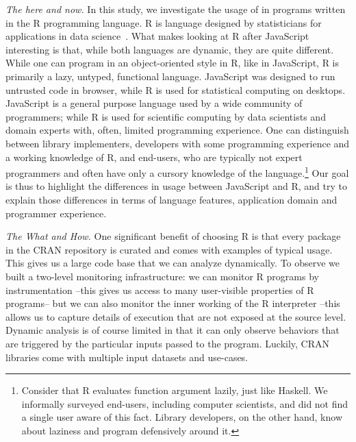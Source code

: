 \documentclass[USenglish,cleveref, autoref, thm-restate]{lipics-v2019}
\begin{document}
\vspace{2mm}\noindent\emph{The here and now.}  In this study, we
investigate the usage of \eval in programs written in the R
programming language. R is language designed by statisticians for
applications in data science~\cite{r,R96}. What makes looking at R after
JavaScript interesting is that, while both languages are dynamic, they
are quite different. While one can program in an object-oriented style
in R, like in JavaScript, R is primarily a lazy, untyped, functional
language.  JavaScript was designed to run untrusted code in browser,
while R is used for statistical computing on desktops. JavaScript is a
general purpose language used by a wide community of programmers;
while R is used for scientific computing by data scientists and domain
experts with, often, limited programming experience. One can
distinguish between library implementers, developers with some
programming experience and a working knowledge of R, and end-users,
who are typically not expert programmers and often have only a cursory
knowledge of the language.\footnote{Consider that R evaluates function
argument lazily, just like Haskell. We informally surveyed end-users,
including computer scientists, and did not find a single user aware of
this fact. Library developers, on the other hand, know about laziness
and program defensively around it.} Our goal is thus to highlight the
differences in usage between JavaScript and R, and try to explain
those differences in terms of language features, application domain
and programmer experience.

\vspace{2mm}\noindent\emph{The What and How.}  One significant benefit
of choosing R is that every package in the CRAN repository is curated
and comes with examples of typical usage. This gives us a large code
base that we can analyze dynamically.  To observe \eval we built a
two-level monitoring infrastructure: we can monitor R programs by
instrumentation --this gives us access to many user-visible properties
of R programs-- but we can also monitor the inner working of the R
interpreter --this allows us to capture details of execution that are
not exposed at the source level. Dynamic analysis is of course limited
in that it can only observe behaviors that are triggered by the
particular inputs passed to the program. Luckily, CRAN libraries come
with multiple input datasets and use-cases.
\end{document}
